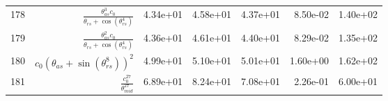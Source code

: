 \begin{tabularx}{\textwidth}{lRRRRRl}
178  &  $ \displaystyle\frac{\theta_{as}^{3} c_{0}}{\theta_{rs} + \cos{\left(\theta_{rs}^{4} \right)}} $  &  4.34e+01  &  4.58e+01  &  4.37e+01  &  8.50e-02  &  1.40e+02  \\ 
179  &  $ \displaystyle\frac{\theta_{as}^{2} c_{0}}{\theta_{rs} + \cos{\left(\theta_{rs}^{4} \right)}} $  &  4.36e+01  &  4.61e+01  &  4.40e+01  &  8.29e-02  &  1.35e+02  \\ 
180  &  $ c_{0} \left(\theta_{as} + \sin{\left(\theta_{rs}^{8} \right)}\right)^{2} $  &  4.99e+01  &  5.10e+01  &  5.01e+01  &  1.60e+00  &  1.62e+02  \\ 
181  &  $ \displaystyle\frac{c_{0}^{27}}{\theta_{mid}^{27}} $  &  6.89e+01  &  8.24e+01  &  7.08e+01  &  2.26e-01  &  6.00e+01  \\ 
\bottomrule
\end{tabularx}

